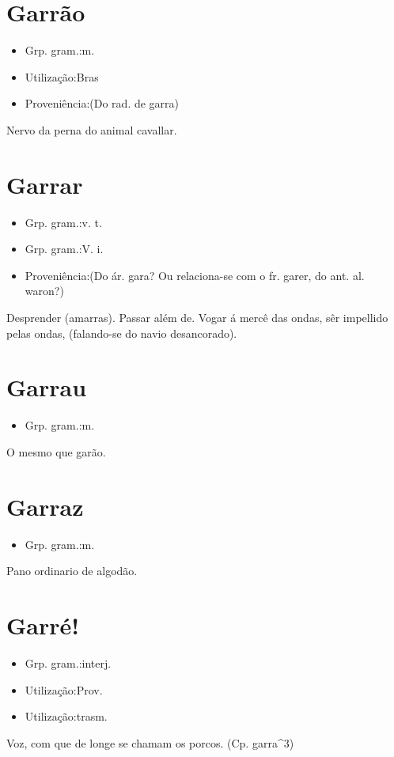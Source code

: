 \section{Garrão}
\begin{itemize}
\item {Grp. gram.:m.}
\end{itemize}
\begin{itemize}
\item {Utilização:Bras}
\end{itemize}
\begin{itemize}
\item {Proveniência:(Do rad. de \textunderscore garra\textunderscore )}
\end{itemize}
Nervo da perna do animal cavallar.
\section{Garrar}
\begin{itemize}
\item {Grp. gram.:v. t.}
\end{itemize}
\begin{itemize}
\item {Grp. gram.:V. i.}
\end{itemize}
\begin{itemize}
\item {Proveniência:(Do ár. \textunderscore gara\textunderscore ? Ou relaciona-se com o fr. \textunderscore garer\textunderscore , do ant. al. \textunderscore waron\textunderscore ?)}
\end{itemize}
Desprender (amarras).
Passar além de.
Vogar á mercê das ondas, sêr impellido pelas ondas, (falando-se do navio desancorado).
\section{Garrau}
\begin{itemize}
\item {Grp. gram.:m.}
\end{itemize}
O mesmo que \textunderscore garão\textunderscore .
\section{Garraz}
\begin{itemize}
\item {Grp. gram.:m.}
\end{itemize}
Pano ordinario de algodão.
\section{Garré!}
\begin{itemize}
\item {Grp. gram.:interj.}
\end{itemize}
\begin{itemize}
\item {Utilização:Prov.}
\end{itemize}
\begin{itemize}
\item {Utilização:trasm.}
\end{itemize}
Voz, com que de longe se chamam os porcos.
(Cp. \textunderscore garra\textunderscore ^3)
